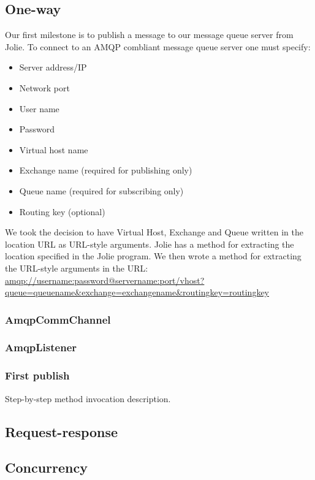 \subsection{One-way}
Our first milestone is to publish a message to our message queue server from Jolie. To connect to an AMQP combliant message queue server one must specify:
\begin{itemize}
\item Server address/IP
\item Network port
\item User name
\item Password
\item Virtual host name
\item Exchange name (required for publishing only)
\item Queue name (required for subscribing only)
\item Routing key (optional)
\end{itemize}
We took the decision to have Virtual Host, Exchange and Queue written in the location URL as URL-style arguments. Jolie has a method for extracting the location specified in the Jolie program. We then wrote a method for extracting the URL-style arguments in the URL:\\
\url{amqp://username:password@servername:port/vhost?queue=queuename&exchange=exchangename&routingkey=routingkey}\\
\subsubsection{AmqpCommChannel}
\subsubsection{AmqpListener}
\subsubsection{First publish}
Step-by-step method invocation description.
\subsection{Request-response}
\subsection{Concurrency}
\newpage
